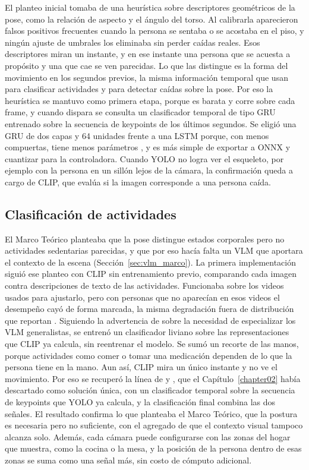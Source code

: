 El planteo inicial tomaba de \textcite{Giri2025} una heurística sobre descriptores geométricos de la pose, como la relación de aspecto y el ángulo del torso.
Al calibrarla aparecieron falsos positivos frecuentes cuando la persona se sentaba o se acostaba en el piso, y ningún ajuste de umbrales los eliminaba sin perder caídas reales.
Esos descriptores miran un instante, y en ese instante una persona que se acuesta a propósito y una que cae se ven parecidas.
Lo que las distingue es la forma del movimiento en los segundos previos, la misma información temporal que usan \textcite{Ramirez2022} para clasificar actividades y \textcite{Wang2024} para detectar caídas sobre la pose.
Por eso la heurística se mantuvo como primera etapa, porque es barata y corre sobre cada frame, y cuando dispara se consulta un clasificador temporal de tipo GRU entrenado sobre la secuencia de keypoints de los últimos segundos.
Se eligió una GRU de dos capas y 64 unidades frente a una LSTM porque, con menos compuertas, tiene menos parámetros \parencite{Cho2014}, y es más simple de exportar a ONNX y cuantizar para la controladora.
Cuando YOLO no logra ver el esqueleto, por ejemplo con la persona en un sillón lejos de la cámara, la confirmación queda a cargo de CLIP, que evalúa si la imagen corresponde a una persona caída.

\subsection{Clasificación de actividades}

El Marco Teórico planteaba que la pose distingue estados corporales pero no actividades sedentarias parecidas, y que por eso hacía falta un VLM que aportara el contexto de la escena (Sección~\ref{sec:vlm_marco}).
La primera implementación siguió ese planteo con CLIP sin entrenamiento previo, comparando cada imagen contra descripciones de texto de las actividades.
Funcionaba sobre los videos usados para ajustarlo, pero con personas que no aparecían en esos videos el desempeño cayó de forma marcada, la misma degradación fuera de distribución que reportan \textcite{Schonfeldt2025}.
Siguiendo la advertencia de \textcite{Reilly2025b} sobre la necesidad de especializar los VLM generalistas, se entrenó un clasificador liviano sobre las representaciones que CLIP ya calcula, sin reentrenar el modelo.
Se sumó un recorte de las manos, porque actividades como comer o tomar una medicación dependen de lo que la persona tiene en la mano.
Aun así, CLIP mira un único instante y no ve el movimiento.
Por eso se recuperó la línea de \textcite{Ramirez2022} y \textcite{Elnady2025}, que el Capítulo~\ref{chapter02} había descartado como solución única, con un clasificador temporal sobre la secuencia de keypoints que YOLO ya calcula, y la clasificación final combina las dos señales.
El resultado confirma lo que planteaba el Marco Teórico, que la postura es necesaria pero no suficiente, con el agregado de que el contexto visual tampoco alcanza solo.
Además, cada cámara puede configurarse con las zonas del hogar que muestra, como la cocina o la mesa, y la posición de la persona dentro de esas zonas se suma como una señal más, sin costo de cómputo adicional.


